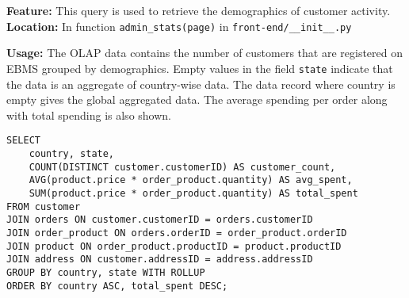 \textbf{Feature:} This query is used to retrieve the demographics of customer activity. \\
\textbf{Location:} In function \texttt{admin\_stats(page)} in \texttt{front-end/\_\_init\_\_.py}

\textbf{Usage:}
The OLAP data contains the number of customers that are registered on EBMS grouped by demographics.
Empty values in the field \texttt{state} indicate that the data is an aggregate of country-wise data.
The data record where country is empty gives the global aggregated data.
The average spending per order along with total spending is also shown.

\begin{lstlisting}
SELECT
    country, state,
    COUNT(DISTINCT customer.customerID) AS customer_count,
    AVG(product.price * order_product.quantity) AS avg_spent,
    SUM(product.price * order_product.quantity) AS total_spent
FROM customer
JOIN orders ON customer.customerID = orders.customerID
JOIN order_product ON orders.orderID = order_product.orderID
JOIN product ON order_product.productID = product.productID
JOIN address ON customer.addressID = address.addressID
GROUP BY country, state WITH ROLLUP
ORDER BY country ASC, total_spent DESC;
\end{lstlisting}

